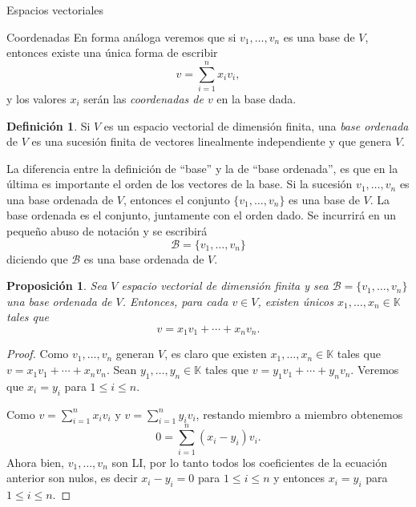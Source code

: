 \documentclass[a4paper,12pt,twoside,spanish,reqno]{amsbook}
\newtheorem{proposicion}[teorema]{Proposici\'on}
\theoremstyle{definition}
\newtheorem{definicion}{Definici\'on}[section]
\theoremstyle{remark}
\newcommand{\K}{\mathbb K}
\begin{document}
\begin{chapter}{Espacios vectoriales}
\begin{section}{Coordenadas}
        En  forma análoga veremos que si $v_1,\ldots,v_n$  es una base de $V$,  entonces existe una única forma de  escribir 
        $$
        v =  \sum_{i=1}^{n} x_iv_i,
        $$ 
        y los valores  $x_i$  serán las \textit{coordenadas de $v$} en la base dada. 
        
        \begin{definicion}
            Si $V$ es un espacio vectorial de dimensión finita, una \textit{base ordenada} de $V$ es una sucesión finita de vectores linealmente independiente y que genera $V$.
        \end{definicion}
        
        
        La diferencia entre la definición de ``base'' y la de ``base ordenada'',  es que en la última es  importante el orden de los vectores de la base. Si la sucesión $v_1,\ldots,v_n$ es una base ordenada de $V$, entonces el conjunto $\{v_1,\ldots,v_n\}$ es una base de $V$. La base ordenada es el conjunto, juntamente con el orden dado. Se incurrirá en un pequeño abuso de notación y se escribirá
        $$
        \mathcal{B} = \{v_1,\ldots,v_n\}
        $$
        diciendo que $\mathcal{B}$ es una base ordenada de $V$.
        
        \begin{proposicion}
            Sea $V$  espacio vectorial de dimensión finita y sea $\mathcal{B} = \{v_1,\ldots,v_n\}$ una base ordenada de $V$. Entonces, para cada $v \in V$,  existen únicos $x_1,\ldots,x_n \in \K$ tales que $$v =   x_1v_1 + \cdots +x_nv_n.$$
        \end{proposicion}
        \begin{proof}
            Como $v_1,\ldots,v_n$  generan $V$,  es claro que existen $x_1,\ldots,x_n \in \K$ tales que $v =   x_1v_1 + \cdots +x_nv_n$. Sean $y_1,\ldots,y_n \in \K$ tales que $v =   y_1v_1 + \cdots +y_nv_n$. Veremos que $x_i = y_i$ para $1 \le i \le n$.
            
            Como $v =  \sum_{i=1}^{n} x_iv_i$ y $v =  \sum_{i=1}^{n} y_iv_i$,  restando miembro a miembro obtenemos 
            $$
            0 =   \sum_{i=1}^{n} (x_i-y_i)v_i.
            $$
            Ahora bien,  $v_1,\ldots,v_n$ son  LI, por lo tanto todos los coeficientes de la ecuación anterior son nulos, es decir $x_i-y_i=0$ para $1 \le i \le n$ y entonces $x_i = y_i$ para $1 \le i \le n$.
        \end{proof}
    

\end{section}
\end{chapter}
\end{document}
